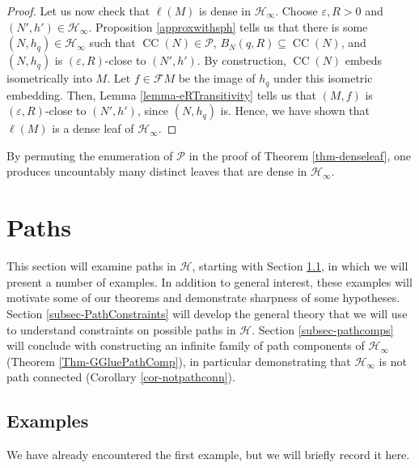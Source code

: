 \documentclass[11pt,leqno]{article}
\DeclareMathOperator{\CC}{CC}
\theoremstyle{introdef}
\numberwithin{lemma}{section}
\theoremstyle{definition}
\begin{document}
\begin{proof}
    Let us now check that $\ell(M)$ is dense in $\mathcal{H}_\infty$. Choose $\varepsilon,R>0$ and $(N',h')\in\mathcal{H}_\infty$. Proposition \ref{approxwithsph} tells us that there is some $(N,h_q)\in\mathcal{H}_\infty$ such that $ \CC(N)\in\mathcal{P}$, $B_{N}(q,R)\subseteq \CC(N)$, and $(N,h_q)$ is $(\varepsilon,R)$-close to $(N',h')$. By construction, $\CC(N)$ embeds isometrically into $M$. Let $f\in \mathcal{F}M$ be the image of $h_q$ under this isometric embedding. Then, Lemma \ref{lemma-eRTransitivity} tells us that $(M,f)$ is $(\varepsilon,R)$-close to $(N',h')$, since $(N,h_q)$ is. Hence, we have shown that $\ell(M)$ is a dense leaf of $\mathcal{H}_\infty$.
\end{proof}

By permuting the enumeration of $\mathcal{P}$ in the proof of Theorem \ref{thm-denseleaf}, one produces uncountably many distinct leaves that are dense in $\mathcal{H}_\infty$.




\section{Paths}
\label{sec-paths}

This section will examine paths in $\mathcal{H}$, starting with Section \ref{subsec-pathexamples}, in which we will present a number of examples. In addition to general interest, these examples will motivate some of our theorems and demonstrate sharpness of some hypotheses. Section \ref{subsec-PathConstraints} will develop the general theory that we will use to understand constraints on possible paths in $\mathcal{H}$. Section \ref{subsec-pathcomps} will conclude with constructing an infinite family of path components of $\mathcal{H}_\infty$ (Theorem \ref{Thm-GGluePathComp}), in particular demonstrating that $\mathcal{H}_\infty$ is not path connected (Corollary \ref{cor-notpathconn}).



\subsection{Examples}
\label{subsec-pathexamples}

We have already encountered the first example, but we will briefly record it here.\par

\vspace{.1in}
\end{document}
